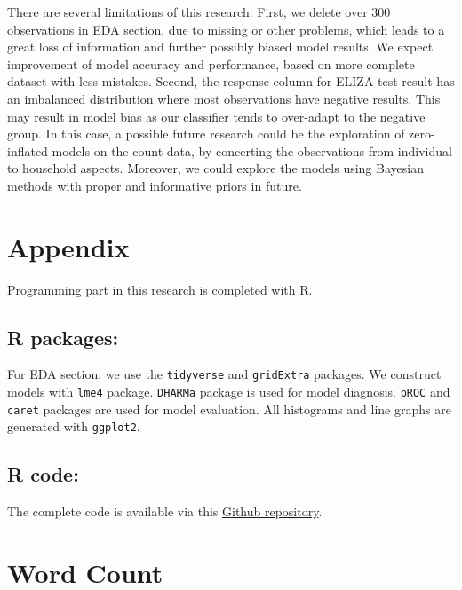 \documentclass[11pt,twoside]{article}
\numberwithin{Theorem}{section}
\numberwithin{Definition}{section}
\numberwithin{Lemma}{section}
\numberwithin{Algorithm}{section}
\numberwithin{equation}{section}
\begin{document}
There are several limitations of this research. First, we delete over 300 observations in EDA section, due to missing or other problems, which leads to a great loss of information and further possibly biased model results. We expect improvement of model accuracy and performance, based on more complete dataset with less mistakes. Second, the response column for ELIZA test result has an imbalanced distribution where most observations have negative results. This may result in model bias as our classifier tends to over-adapt to the negative group. In this case, a possible future research could be the exploration of zero-inflated models on the count data, by concerting the observations from individual to household aspects. Moreover, we could explore the models using Bayesian methods with proper and informative priors in future.

\clearpage



\clearpage

\appendix
\section*{Appendix}

Programming part in this research is completed with R. 

\subsection*{R packages:}

For EDA section, we use the \texttt{tidyverse} and \texttt{gridExtra} packages. We construct models with \texttt{lme4} package. \texttt{DHARMa} package is used for model diagnosis. \texttt{pROC} and \texttt{caret} packages are used for model evaluation. All histograms and line graphs are generated with \texttt{ggplot2}.

\subsection*{R code: }
The complete code is available via this \href{https://github.com/Shi-Yile/Project-2-Leptospirosis-Risk-Factors.git}{Github repository}.

\clearpage

\section*{Word Count}
\end{document}
